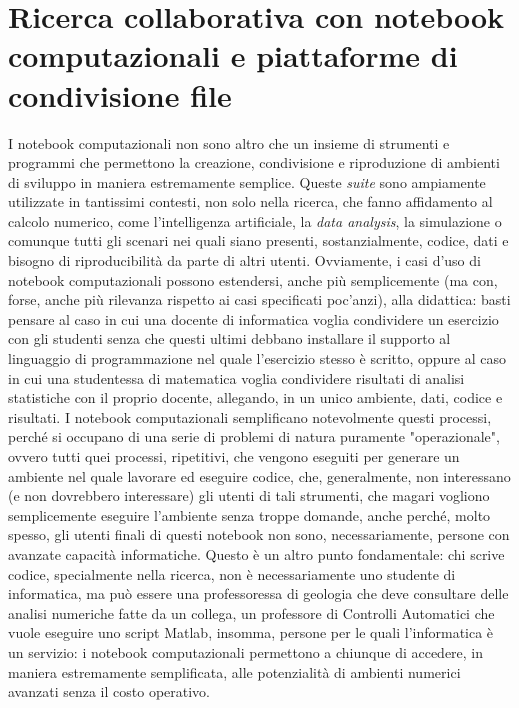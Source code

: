 \chapter{Ricerca collaborativa con notebook computazionali e piattaforme di condivisione file}
I notebook computazionali non sono altro che un insieme di strumenti e programmi che permettono la creazione, condivisione e riproduzione di ambienti di sviluppo in maniera estremamente semplice. Queste \textit{suite} sono ampiamente utilizzate in tantissimi contesti, non solo nella ricerca, che fanno affidamento al calcolo numerico, come l'intelligenza artificiale, la \textit{data analysis}, la simulazione o comunque tutti gli scenari nei quali siano presenti, sostanzialmente, codice, dati e bisogno di riproducibilità da parte di altri utenti.
\newline
Ovviamente, i casi d'uso di notebook computazionali possono estendersi, anche più semplicemente (ma con, forse, anche più rilevanza rispetto ai casi specificati poc'anzi), alla didattica: basti pensare al caso in cui una docente di informatica voglia condividere un esercizio con gli studenti senza che questi ultimi debbano installare il supporto al linguaggio di programmazione nel quale l'esercizio stesso è scritto, oppure al caso in cui una studentessa di matematica voglia condividere risultati di analisi statistiche con il proprio docente, allegando, in un unico ambiente, dati, codice e risultati.
\newline
I notebook computazionali semplificano notevolmente questi processi, perché si occupano di una serie di problemi di natura puramente "operazionale", ovvero tutti quei processi, ripetitivi, che vengono eseguiti per generare un ambiente nel quale lavorare ed eseguire codice, che, generalmente, non interessano (e non dovrebbero interessare) gli utenti di tali strumenti, che magari vogliono semplicemente eseguire l'ambiente senza troppe domande, anche perché, molto spesso, gli utenti finali di questi notebook non sono, necessariamente, persone con avanzate capacità informatiche. Questo è un altro punto fondamentale: chi scrive codice, specialmente nella ricerca, non è necessariamente uno studente di informatica, ma può essere una professoressa di geologia che deve consultare delle analisi numeriche fatte da un collega, un professore di Controlli Automatici che vuole eseguire uno script Matlab, insomma, persone per le quali l'informatica è un servizio: i notebook computazionali permettono a chiunque di accedere, in maniera estremamente semplificata, alle potenzialità di ambienti numerici avanzati senza il costo operativo.

